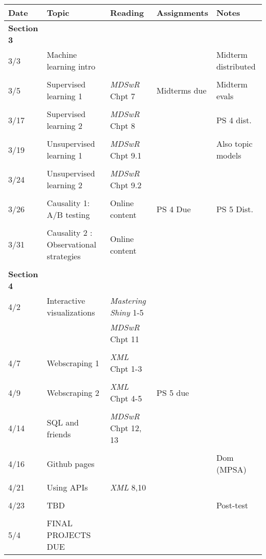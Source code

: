 \documentclass[11pt]{article}
\begin{document}
\begin{small}
\begin{center}
\begin{tabular}{p{1.5cm} p{4cm} p{3.5cm} p{3cm} p{4cm}}
  \toprule
  Date & Topic & Reading & Assignments & Notes  \\
  \midrule
\textbf{Section 3} \\
3/3 & Machine learning intro  & & & Midterm distributed\\
\\
3/5 & Supervised learning 1& \textit{MDSwR} Chpt 7 &  Midterms due& Midterm evals\\
\\
3/17 & Supervised learning 2& \textit{MDSwR} Chpt 8   & & PS 4 dist.\\
\\
3/19  & Unsupervised learning 1& \textit{MDSwR} Chpt 9.1 & & Also topic models \\
\\
3/24 & Unsupervised learning 2 &\textit{MDSwR} Chpt 9.2 & & \\
\\
3/26  & Causality 1: A/B testing & Online content & PS 4 Due & PS 5 Dist. \\
\\
3/31 & Causality 2 : Observational strategies &  Online content \\
\\
\textbf{Section 4} \\
4/2 &  Interactive visualizations & \textit{Mastering Shiny} 1-5 \\
& & \textit{MDSwR} Chpt 11 \\
\\
4/7 & Webscraping 1 & \textit{XML} Chpt 1-3\\
\\
4/9 & Webscraping 2 & \textit{XML} Chpt 4-5 & PS 5 due \\
\\
4/14 & SQL and friends  & \textit{MDSwR} Chpt 12, 13\\
\\
4/16 & Github pages & & & Dom (MPSA)\\
\\
4/21 & Using APIs & \textit{XML} 8,10 \\
\\
4/23 & TBD  &  & & Post-test\\
\\
5/4 & FINAL PROJECTS DUE
\end{tabular}
\end{center}
\end{small}
\end{document}
